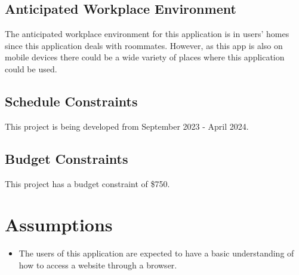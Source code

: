 \documentclass[12pt]{article}
\newcommand{\lips}{\textit{Insert your content here.}}
\begin{document}
\subsection{Anticipated Workplace Environment}
The anticipated workplace environment for this application is in users' homes since this application deals with roommates. However, as this app is also on mobile devices there could be a wide variety of places where this application could be used.

\subsection{Schedule Constraints}
This project is being developed from September 2023 - April 2024.
\subsection{Budget Constraints}
This project has a budget constraint of \$750.



\section{Assumptions}
\begin{itemize}
    \item The users of this application are expected to have a basic understanding of how to access a website through a browser.
\end{itemize}

\end{document}

